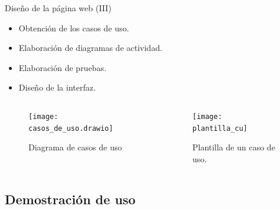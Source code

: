 \begin{frame}{Diseño de la página web (III)}

    \begin{itemize}
        \item Obtención de los casos de uso.
        \item Elaboración de diagramas de actividad.
        \item Elaboración de pruebas.
        \item Diseño de la interfaz.
    \end{itemize}

    \begin{columns}
        \begin{column}{0.5\textwidth} 
            \begin{figure}[!h]
                \begin{center}
                \caption{Diagrama de casos de uso}
                \label{diag: casos_uso}
                \texttt{[image: casos\_de\_uso.drawio]}
                \end{center}
                \end{figure}
        \end{column}
    
        \begin{column}{0.5\textwidth}  
            \begin{figure}[!h]
                \begin{center}
                \caption{Plantilla de un caso de uso.}
                \label{diag: plantilla_cu}
                \texttt{[image: plantilla\_cu]}
                \end{center}
                \end{figure}
        \end{column}
    \end{columns}

\end{frame}



\subsection{Demostración de uso}



